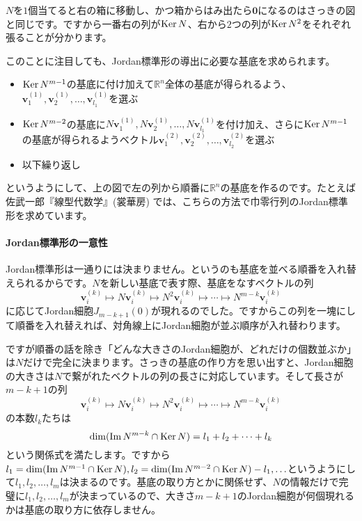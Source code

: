 $N$を$1$個当てると右の箱に移動し、かつ箱からはみ出たら$\bm{0}$になるのはさっきの図と同じです。ですから一番右の列が$\operatorname{Ker} N$、右から$2$つの列が$\operatorname{Ker} N^2$をそれぞれ張ることが分かります。

このことに注目しても、Jordan標準形の導出に必要な基底を求められます。
\begin{itemize}
\item $\operatorname{Ker} N^{m - 1}$の基底に付け加えて$\mathbb{R}^n$全体の基底が得られるよう、$\bm{v}^{(1)}_1, \bm{v}^{(1)}_2, \ldots, \bm{v}^{(1)}_{l_1}$を選ぶ
\item $\operatorname{Ker} N^{m - 2}$の基底に$N\bm{v}^{(1)}_1, N\bm{v}^{(1)}_2, \ldots, N\bm{v}^{(1)}_{l_1}$を付け加え、さらに$\operatorname{Ker} N^{m - 1}$の基底が得られるようベクトル$\bm{v}^{(2)}_1, \bm{v}^{(2)}_2, \ldots, \bm{v}^{(2)}_{l_2}$を選ぶ
\item 以下繰り返し
\end{itemize}
というようにして、上の図で左の列から順番に$\mathbb{R}^n$の基底を作るのです。たとえば佐武一郎『線型代数学』(裳華房) では、こちらの方法で巾零行列のJordan標準形を求めています。

\paragraph{Jordan標準形の一意性}

Jordan標準形は一通りには決まりません。というのも基底を並べる順番を入れ替えられるからです。$N$を新しい基底で表す際、基底をなすベクトルの列
\[
\bm{v}^{(k)}_i \mapsto N \bm{v}^{(k)}_i \mapsto N^2 \bm{v}^{(k)}_i \mapsto \cdots \mapsto N^{m - k} \bm{v}^{(k)}_i
\]
に応じてJordan細胞$J_{m - k + 1}(0)$が現れるのでした。ですからこの列を一塊にして順番を入れ替えれば、対角線上にJordan細胞が並ぶ順序が入れ替わります。

ですが順番の話を除き「どんな大きさのJordan細胞が、どれだけの個数並ぶか」は$N$だけで完全に決まります。さっきの基底の作り方を思い出すと、Jordan細胞の大きさは$N$で繋がれたベクトルの列の長さに対応しています。そして長さが$m - k + 1$の列
\[
\bm{v}^{(k)}_i \mapsto N \bm{v}^{(k)}_i \mapsto N^2 \bm{v}^{(k)}_i \mapsto \cdots \mapsto N^{m - k} \bm{v}^{(k)}_i
\]
の本数$l_k$たちは
\[
\dim (\mathrm{Im}\, N^{m - k} \cap \operatorname{Ker} N) = l_1 + l_2 + \cdots + l_k
\]
という関係式を満たします。ですから$l_1 = \dim (\mathrm{Im}\, N^{m - 1} \cap \operatorname{Ker} N), l_2 = \dim (\mathrm{Im}\, N^{m - 2} \cap \operatorname{Ker} N) - l_1, \ldots$というようにして$l_1, l_2, \ldots, l_m$は決まるのです。基底の取り方とかに関係せず、$N$の情報だけで完璧に$l_1, l_2, \ldots, l_m$が決まっているので、大きさ$m - k + 1$のJordan細胞が何個現れるかは基底の取り方に依存しません。


